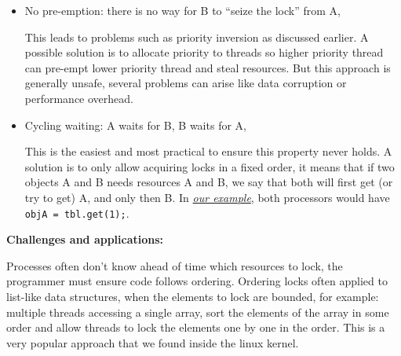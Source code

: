 \begin{tcolorbox}[gris]
\begin{itemize}[left=10pt, label=\textbullet]
\begin{image}{A possible solution is to say that a thread must acquire all resources before it runs. In our example it would be like going from fine-grained locking to coarse-grained locking.}
                \end{image}
            \item No pre-emption: there is no way for B to ``seize the lock'' from A,

                This leads to problems such as priority inversion as discussed earlier. A possible solution is to allocate priority to threads so higher priority thread can pre-empt lower priority thread and steal resources. But this approach is generally unsafe, several problems can arise like data corruption or performance overhead.
            \item Cycling waiting: A waits for B, B waits for A,

                This is the easiest and most practical to ensure this property never holds. A solution is to only allow acquiring locks in a fixed order, it means that if two objects A and B needs resources A and B, we say that both will first get (or try to get) A, and only then B. In \hyperlink{locks}{\textit{our example}}, both processors would have \lstinline!objA = tbl.get(1);!. 
        \end{itemize}
    \end{tcolorbox}
        \textbf{Challenges and applications:}

        Processes often don't know ahead of time which resources to lock, the programmer must ensure code follows ordering. Ordering locks often applied to list-like data structures, when the elements to lock are bounded, for example: multiple threads accessing a single array, sort the elements of the array in some order and allow threads to lock the elements one by one in the order. This is a very popular approach that we found inside the linux kernel.
        
